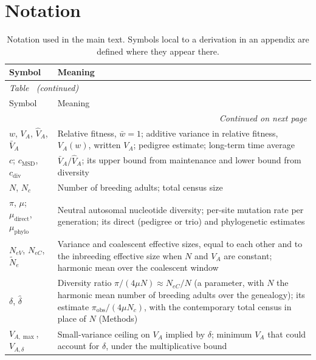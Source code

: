 \documentclass{article}
\begin{document}
\fi
\clearpage
\section*{Notation}
\begingroup
\small
\setlength{\LTcapwidth}{\textwidth}
\begin{longtable}{l>{\raggedright\arraybackslash}p{}}
\caption{Notation used in the main text. Symbols local to a derivation in an appendix are defined where they appear there.}\label{tab:notation}\\
\toprule
Symbol & Meaning \\
\midrule
\endfirsthead
\multicolumn{2}{l}{\textit{Table~\thetable{} (continued)}}\\
\toprule
Symbol & Meaning \\
\midrule
\endhead
\midrule
\multicolumn{2}{r}{\textit{Continued on next page}}\\
\endfoot
\bottomrule
\endlastfoot
$w$, $V_A$, $\hat{V}_A$, $\bar{V}_A$ & Relative fitness, $\bar{w} = 1$; additive variance in relative fitness, $V_A(w)$, written $V_A$; pedigree estimate; long-term time average \\
$c$; $c_\text{MSD}$, $c_\text{div}$ & $\bar{V}_A/\hat{V}_A$; its upper bound from maintenance and lower bound from diversity \\
$N$, $N_c$ & Number of breeding adults; total census size \\
$\pi$, $\mu$; $\mu_\text{direct}$, $\mu_\text{phylo}$ & Neutral autosomal nucleotide diversity; per-site mutation rate per generation; its direct (pedigree or trio) and phylogenetic estimates \\
$N_{eV}$, $N_{eC}$, $\tilde{N}_e$ & Variance and coalescent effective sizes, equal to each other and to the inbreeding effective size when $N$ and $V_A$ are constant; harmonic mean over the coalescent window \\
$\delta$, $\hat{\delta}$ & Diversity ratio $\pi/(4\mu N) \approx N_{eC}/N$ (a parameter, with $N$ the harmonic mean number of breeding adults over the genealogy); its estimate $\pi_\text{obs}/(4\mu N_c)$, with the contemporary total census in place of $N$ (Methods) \\
$V_{A,\max}$, $V_{A,\delta}$ & Small-variance ceiling on $V_A$ implied by $\delta$; minimum $V_A$ that could account for $\delta$, under the multiplicative bound \\

\end{longtable}
\end{document}
